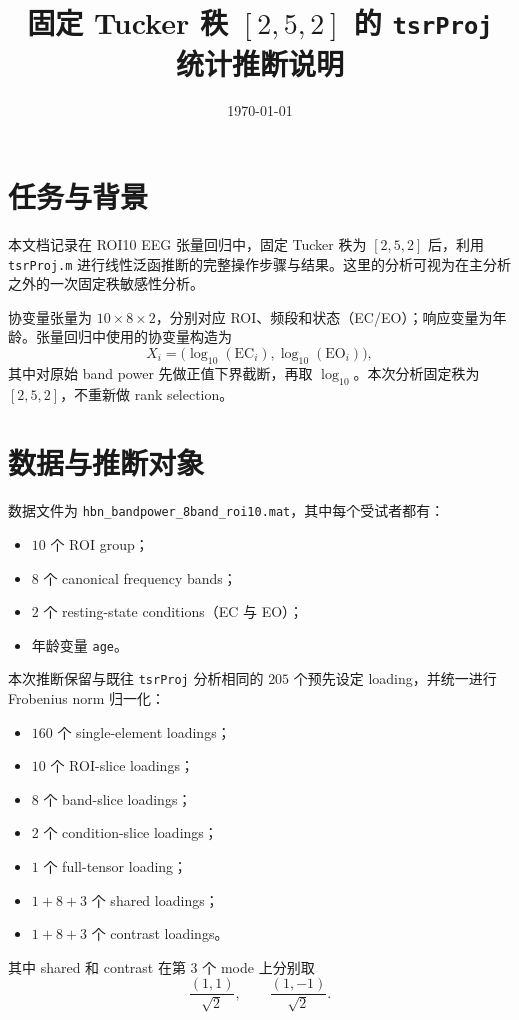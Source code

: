 \documentclass[11pt]{ctexart}
\title{固定 Tucker 秩 \texorpdfstring{$[2,5,2]$}{[2,5,2]} 的 \texttt{tsrProj} 统计推断说明}
\author{}
\date{\today}
\begin{document}
\maketitle

\section{任务与背景}
本文档记录在 ROI10 EEG 张量回归中，固定 Tucker 秩为 $[2,5,2]$ 后，利用 \texttt{tsrProj.m} 进行线性泛函推断的完整操作步骤与结果。这里的分析可视为在主分析之外的一次固定秩敏感性分析。

协变量张量为 $10\times 8\times 2$，分别对应 ROI、频段和状态（EC/EO）；响应变量为年龄。张量回归中使用的协变量构造为
\[
X_i = \bigl(\log_{10}(\mathrm{EC}_i), \log_{10}(\mathrm{EO}_i)\bigr),
\]
其中对原始 band power 先做正值下界截断，再取 $\log_{10}$。本次分析固定秩为 $[2,5,2]$，不重新做 rank selection。

\section{数据与推断对象}
数据文件为 \texttt{hbn\_bandpower\_8band\_roi10.mat}，其中每个受试者都有：
\begin{itemize}
\item $10$ 个 ROI group；
\item $8$ 个 canonical frequency bands；
\item $2$ 个 resting-state conditions（EC 与 EO）；
\item 年龄变量 \texttt{age}。
\end{itemize}

本次推断保留与既往 \texttt{tsrProj} 分析相同的 $205$ 个预先设定 loading，并统一进行 Frobenius norm 归一化：
\begin{itemize}
\item $160$ 个 single-element loadings；
\item $10$ 个 ROI-slice loadings；
\item $8$ 个 band-slice loadings；
\item $2$ 个 condition-slice loadings；
\item $1$ 个 full-tensor loading；
\item $1+8+3$ 个 shared loadings；
\item $1+8+3$ 个 contrast loadings。
\end{itemize}

其中 shared 和 contrast 在第 3 个 mode 上分别取
\[
\frac{(1,1)}{\sqrt{2}},\qquad \frac{(1,-1)}{\sqrt{2}}.
\]
\end{document}
